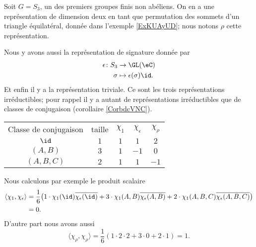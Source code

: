 Soit \( G=S_3\), un des premiers groupes finis non abéliens. On en a une représentation de dimension deux en tant que permutation des sommets d'un triangle équilatéral, donnée dans l'exemple \ref{ExKUAyUD}; nous notons \( \rho\) cette représentation.

Nous y avons aussi la représentation de signature donnée par
\begin{equation}
    \begin{aligned}
        \epsilon\colon S_3&\to \GL(\eC) \\
        \sigma&\mapsto \epsilon(\sigma)\id. 
    \end{aligned}
\end{equation}
Et enfin il y a la représentation triviale. Ce sont les trois représentations irréductibles; pour rappel il y a autant de représentations irréductibles que de classes de conjugaison (corollaire \ref{CorbdcVNC}).

\begin{center}
    \begin{tabular}[]{ccccc}
        Classe de conjugaison   &   taille  &   \( \chi_1\) &   \( \chi_{\epsilon}\)    &   $\chi_{\rho}$\\
         $\id$   &   $1$    &   $1$    &   $1$    &   $2$    \\
         \( (A,B)\)   &   $3$    &   $1$    &   $-1$    &   $0$    \\
         \( (A,B,C)\)   &   \( 2\)    &   \( 1\)    &   \( 1\)    &   $-1$    \\
    \end{tabular}
\end{center}

Nous calculons par exemple le produit scalaire
\begin{subequations}
    \begin{align}
        \langle \chi_1, \chi_{\epsilon}\rangle &=\frac{1}{ 6 }\big( 1\cdot\chi_1(\id)\overline{ \chi_{\epsilon}(\id) }+3\cdot \chi_1(A,B)\overline{ \chi_{\epsilon}(A,B) }+2\cdot \chi_1(A,B,C)\overline{ \chi_{\epsilon}(A,B,C) } \big)\\
        &=0.
    \end{align}
\end{subequations}
D'autre part nous avons aussi
\begin{equation}
    \langle \chi_{\rho}, \chi_{\rho}\rangle =\frac{1}{ 6 }(1\cdot2\cdot 2+3\cdot 0+2\cdot 1)=1.
\end{equation}

